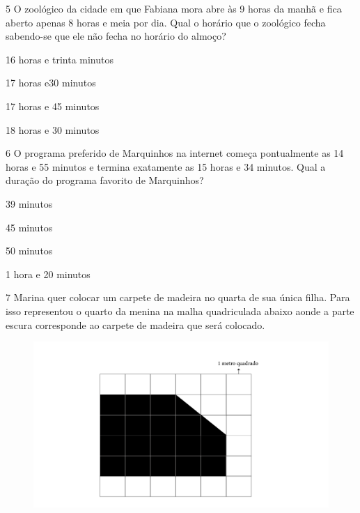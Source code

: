 
\num{5} O zoológico da cidade em que Fabiana mora abre às 9 horas da manhã
e fica aberto apenas 8 horas e meia por dia. Qual o horário que o
zoológico fecha sabendo-se que ele não fecha no horário do almoço?

\begin{escolha}
\item
  16 horas e trinta minutos
\item
  17 horas e30 minutos
\item
  17 horas e 45 minutos
\item
  18 horas e 30 minutos
\end{escolha}


\num{6} O programa preferido de Marquinhos na internet começa pontualmente
as 14 horas e 55 minutos e termina exatamente as 15 horas e 34 minutos.
Qual a duração do programa favorito de Marquinhos?

\begin{escolha}
\item
  39 minutos
\item
  45 minutos
\item
  50 minutos
\item
  1 hora e 20 minutos
\end{escolha}


\num{7} Marina quer colocar um carpete de madeira no quarta de sua única
filha. Para isso representou o quarto da menina na malha quadriculada
abaixo aonde a parte escura corresponde ao carpete de madeira que será
colocado.

\begin{figure}[htpb!]
\includegraphics[width=\textwidth]{../ilustracoes/MAT5/SAEB_5ANO_MAT_figura122.png}
\end{figure}

